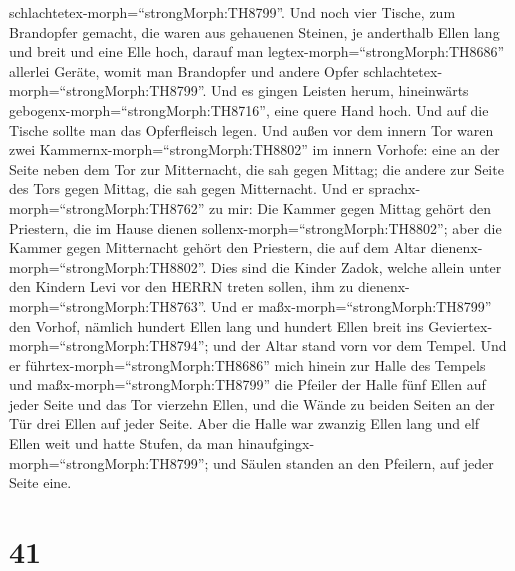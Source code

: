 schlachtetex-morph=``strongMorph:TH8799''.  Und noch vier
Tische, zum Brandopfer gemacht, die waren aus gehauenen Steinen, je
anderthalb Ellen lang und breit und eine Elle hoch, darauf man
legtex-morph=``strongMorph:TH8686'' allerlei Geräte, womit man
Brandopfer und andere Opfer schlachtetex-morph=``strongMorph:TH8799''.
 Und es gingen Leisten herum, hineinwärts
gebogenx-morph=``strongMorph:TH8716'', eine quere Hand hoch. Und auf die
Tische sollte man das Opferfleisch legen.  Und außen vor
dem innern Tor waren zwei Kammernx-morph=``strongMorph:TH8802'' im
innern Vorhofe: eine an der Seite neben dem Tor zur Mitternacht, die sah
gegen Mittag; die andere zur Seite des Tors gegen Mittag, die sah gegen
Mitternacht.  Und er sprachx-morph=``strongMorph:TH8762''
zu mir: Die Kammer gegen Mittag gehört den Priestern, die im Hause
dienen sollenx-morph=``strongMorph:TH8802'';  aber die
Kammer gegen Mitternacht gehört den Priestern, die auf dem Altar
dienenx-morph=``strongMorph:TH8802''. Dies sind die Kinder Zadok, welche
allein unter den Kindern Levi vor den HERRN treten sollen, ihm zu
dienenx-morph=``strongMorph:TH8763''.  Und er
maßx-morph=``strongMorph:TH8799'' den Vorhof, nämlich hundert Ellen lang
und hundert Ellen breit ins Geviertex-morph=``strongMorph:TH8794''; und
der Altar stand vorn vor dem Tempel.  Und er
führtex-morph=``strongMorph:TH8686'' mich hinein zur Halle des Tempels
und maßx-morph=``strongMorph:TH8799'' die Pfeiler der Halle fünf Ellen
auf jeder Seite und das Tor vierzehn Ellen, und die Wände zu beiden
Seiten an der Tür drei Ellen auf jeder Seite.  Aber die
Halle war zwanzig Ellen lang und elf Ellen weit und hatte Stufen, da man
hinaufgingx-morph=``strongMorph:TH8799''; und Säulen standen an den
Pfeilern, auf jeder Seite eine.

\hypertarget{section-40}{%
\section{41}\label{section-40}}


